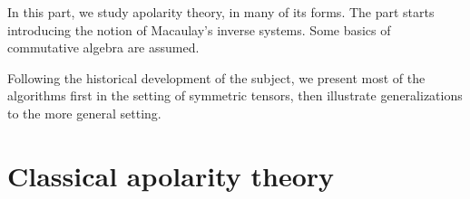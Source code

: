 In this part, we study apolarity theory, in many of its forms. The part starts introducing the notion of Macaulay's inverse systems. Some basics of commutative algebra are assumed.

Following the historical development of the subject, we present most of the algorithms first in the setting of symmetric tensors, then illustrate generalizations to the more general setting. 

\chapter{Classical apolarity theory}
\label{apolarity-chapter-apolarity}


